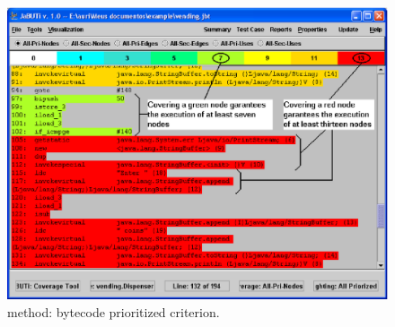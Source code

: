 \begin{figure}[!ht]
\begin{center}
\includegraphics[height=0.40\textheight]{fig/dispenser-bytecode-edited}
\caption{\label{fig:dispenser-bytecode} 
method: bytecode prioritized \wrt {} criterion.}
\end{center}
\end{figure}
